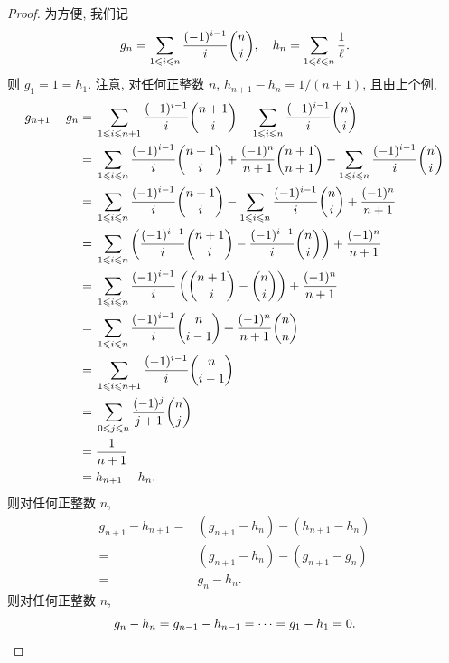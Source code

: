 \documentclass[../libro.tex]{subfiles}
\begin{document}
\begin{proof}
    为方便, 我们记
    \begin{align*}
        g_n = \sum_{1 \leq i \leq n} {\frac{(-1)^{i-1}}{i} \dbinom{n}{i}},
        \quad
        h_n = \sum_{1 \leq \ell \leq n} {\frac{1}{\ell}}.
    \end{align*}
    则 \(g_1 = 1 = h_1\).
    注意, 对任何正整数 \(n\), \(h_{n+1} - h_n = 1/(n+1)\),
    且由上个例,
    \begin{align*}
        g_{n+1} - g_n
        = {} &
        \sum_{1 \leq i \leq n+1} {\frac{(-1)^{i-1}}{i} \dbinom{n+1}{i}}
        - \sum_{1 \leq i \leq n} {\frac{(-1)^{i-1}}{i} \dbinom{n}{i}}
        \\
        = {} &
        \sum_{1 \leq i \leq n} {\frac{(-1)^{i-1}}{i} \dbinom{n+1}{i}}
        + \frac{(-1)^n}{n+1} \dbinom{n+1}{n+1}
        - \sum_{1 \leq i \leq n} {\frac{(-1)^{i-1}}{i} \dbinom{n}{i}}
        \\
        = {} &
        \sum_{1 \leq i \leq n} {\frac{(-1)^{i-1}}{i} \dbinom{n+1}{i}}
        - \sum_{1 \leq i \leq n} {\frac{(-1)^{i-1}}{i} \dbinom{n}{i}}
        + \frac{(-1)^n}{n+1}
        \\
        = {} &
        \sum_{1 \leq i \leq n} {\left(
                \frac{(-1)^{i-1}}{i} \dbinom{n+1}{i}
                - \frac{(-1)^{i-1}}{i} \dbinom{n}{i}
        \right)} + \frac{(-1)^n}{n+1}
        \\
        = {} &
        \sum_{1 \leq i \leq n} {\frac{(-1)^{i-1}}{i} \left(
                \dbinom{n+1}{i} - \dbinom{n}{i}
        \right)} + \frac{(-1)^n}{n+1}
        \\
        = {} &
        \sum_{1 \leq i \leq n} {\frac{(-1)^{i-1}}{i} \dbinom{n}{i-1}}
        + \frac{(-1)^n}{n+1} \dbinom{n}{n}
        \\
        = {} &
        \sum_{1 \leq i \leq n+1} {\frac{(-1)^{i-1}}{i} \dbinom{n}{i-1}}
        \\
        = {} &
        \sum_{0 \leq j \leq n} {\frac{(-1)^j}{j+1} \dbinom{n}{j}}
        \\
        = {} &
        \frac{1}{n+1}
        \\
        = {} &
        h_{n+1} - h_n.
    \end{align*}
    则对任何正整数 \(n\),
    \begin{align*}
        g_{n+1} - h_{n+1}
        = {} &
        (g_{n+1} - h_n) - (h_{n+1} - h_n)
        \\
        = {} &
        (g_{n+1} - h_n) - (g_{n+1} - g_n)
        \\
        = {} &
        g_n - h_n.
    \end{align*}
    则对任何正整数 \(n\),
    \begin{equation*}
        g_n - h_n = g_{n-1} - h_{n-1} = \dots = g_1 - h_1 = 0.
        \qedhere
    \end{equation*}
\end{proof}
\end{document}
